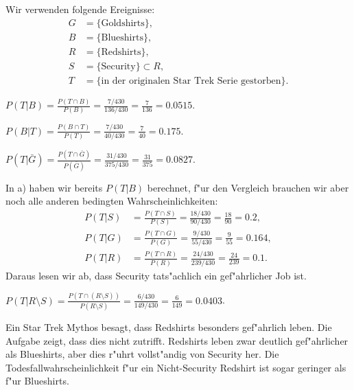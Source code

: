 \begin{loesung}
Wir verwenden folgende Ereignisse:
\begin{align*}
G&=\{\text{Goldshirts}\},\\
B&=\{\text{Blueshirts}\},\\
R&=\{\text{Redshirts}\},\\
S&=\{\text{Security}\}\subset R,\\
T&=\{\text{in der originalen Star Trek Serie gestorben}\}.
\end{align*}
\begin{teilaufgaben}
\item
$
\displaystyle
P(T|B)
=
\frac{P(T\cap B)}{P(B)}
=
\frac{7/430}{136/430}
=
\frac{7}{136}
=0.0515.
$
\item
$
\displaystyle
P(B|T)
=
\frac{P(B\cap T)}{P(T)}
=
\frac{7/430}{40/430}
=
\frac{7}{40}
=0.175.
$
\item
$
\displaystyle
P(T|\bar G)
=
\frac{P(T\cap\bar G)}{P(\bar G)}
=
\frac{31/430}{375/430}
=
\frac{31}{375}
=0.0827.
$
\item
In a) haben wir bereits $P(T|B)$ berechnet, f"ur den Vergleich
brauchen wir aber noch alle anderen bedingten Wahrscheinlichkeiten:
\begin{align*}
P(T|S)&
=\frac{P(T\cap S)}{P(S)}
=\frac{18/430}{90/430}
=\frac{18}{90}
=0.2,
\\
P(T|G)&
=\frac{P(T\cap G)}{P(G)}
=\frac{9/430}{55/430}
=\frac{9}{55}
=0.164,
\\
P(T|R)&
=\frac{P(T\cap R)}{P(R)}
=\frac{24/430}{239/430}
=\frac{24}{239}
=0.1.
\end{align*}
Daraus lesen wir ab, dass Security tats"achlich ein gef"ahrlicher
Job ist.
\item
$
\displaystyle
P(T|R\setminus S)
=\frac{P(T\cap(R\setminus S))}{P(R\setminus S)}
=\frac{6/430}{149/430}
=\frac{6}{149}
=0.0403$.
\end{teilaufgaben}
\end{loesung}

\begin{diskussion}
Ein Star Trek Mythos besagt, dass Redshirts besonders gef"ahrlich
leben. Die Aufgabe zeigt, dass dies nicht zutrifft.
Redshirts leben zwar deutlich gef"ahrlicher als Blueshirts, aber
dies r"uhrt vollst"andig von Security her. Die Todesfallwahrscheinlichkeit
f"ur ein Nicht-Security Redshirt ist sogar geringer als f"ur Blueshirts.
\end{diskussion}


